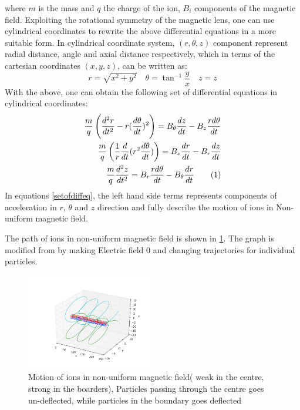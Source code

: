 \documentclass[twocolumn,12pt]{article}
\newcommand\numberthis{\addtocounter{equation}{1}\tag{\theequation}} %
\numberwithin{equation}{section} %
\numberwithin{equation}{section}
\begin{document}
where $m$ is the mass and $q$ the charge of the ion, $B_i$ components of the magnetic field. Exploiting the rotational symmetry of the magnetic lens, one can use cylindrical coordinates to rewrite the above differential equations in a more suitable form. In cylindrical coordinate system, $(r, \theta,z)$ component represent radial distance, angle and axial distance respectively, which in terms of the cartesian coordinates $(x,y,z)$, can be written as:
\begin{equation}
    r=\sqrt{x^2+y^2} \quad     \theta= \tan^{-1}\frac{y}{x} \quad    z=z
\end{equation}
With the above, one can obtain the following set of differential equations in cylindrical coordinates:
\begin{align*}
    \frac{m}{q}\left(\frac{d^2r}{dt^2}-r(\frac{d \theta}{dt})^2\right)= B_\theta \frac{dz}{dt}- B_z\frac{rd\theta}{dt}\\
    \frac{m}{q}\left(\frac{1}{r}\frac{d}{dt}(r^2\frac{d\theta}{dt})\right)=B_z\frac{dr}{dt}-B_r\frac{dz}{dt}\\
    \frac{m}{q}\frac{d^2z}{dt^2}= B_r \frac{rd \theta}{dt}- B_{\theta}\frac{dr}{dt}
    \label{setofdiffeq  } \numberthis
\end{align*}
In equations \ref{setofdiffeq}, the left hand side terms represents components of acceleration in $r$, $\theta$ and $z$ direction and fully describe the motion of ions in Non-uniform magnetic field. 

The path of ions in non-uniform magnetic field is shown in \ref{ionmotion3}. The graph is modified from \cite{code} by making Electric field 0 and changing trajectories for individual particles. 
\begin{figure}[H]
    \centering
    \includegraphics[width=0.5\textwidth]{figs/motion of ions nonuniform.png}
    \caption{Motion of ions in non-uniform magnetic field( weak in the centre, strong in the boarders), Particles passing through the centre goes un-deflected, while particles in the boundary goes deflected}
    \label{ionmotion3}
\end{figure}
\end{document}
